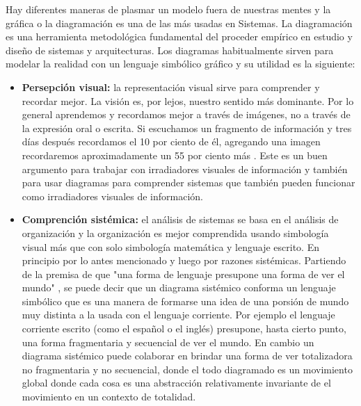 Hay diferentes maneras de plasmar un modelo fuera de nuestras mentes y la gráfica o la diagramación es una de las más usadas en Sistemas. La diagramación es una herramienta metodológica fundamental del proceder empírico en estudio y diseño de sistemas y arquitecturas. Los diagramas habitualmente sirven para modelar la realidad con un lenguaje simbólico gráfico y su utilidad es la siguiente:

\begin{itemize}

\item \textbf{Persepción visual:} la representación visual sirve para comprender y recordar mejor. La visión es, por lejos, nuestro sentido más dominante. Por lo general aprendemos y recordamos mejor a través de imágenes, no a través de la expresión oral o escrita. Si escuchamos un fragmento de información y tres días después recordamos el 10 por ciento de él, agregando una imagen recordaremos aproximadamente un 55 por ciento más \cite{John-Medina-2008}. Este es un buen argumento para trabajar con irradiadores visuales de información y también para usar diagramas para comprender sistemas que también pueden funcionar como irradiadores visuales de información.

\item \textbf{Comprención sistémica:} el análisis de sistemas se basa en el análisis de organización y la organización es mejor comprendida usando simbología visual más que con solo simbología matemática y lenguaje escrito. En principio por lo antes mencionado y luego por razones sistémicas. Partiendo de la premisa de que "una forma de lenguaje presupone una forma de ver el mundo" \cite{David-Bohm-2008}, se puede decir que un diagrama sistémico conforma un lenguaje simbólico que es una manera de formarse una idea de una porsión de mundo muy distinta a la usada con el lenguaje corriente. Por ejemplo el lenguaje corriente escrito (como el español o el inglés) presupone, hasta cierto punto, una forma fragmentaria y secuencial de ver el mundo. En cambio un diagrama sistémico puede colaborar en brindar una forma de ver totalizadora no fragmentaria y no secuencial, donde el todo diagramado es un movimiento global donde cada cosa es una abstracción relativamente invariante de el movimiento en un contexto de totalidad.


\end{itemize}
